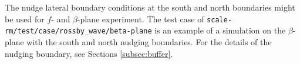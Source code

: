 The nudge lateral boundary conditions at the south and north boundaries might be used for $f$- and $\beta$-plane experiment.
The test case of \verb|scale-rm/test/case/rossby_wave/beta-plane| is an example of a simulation on the $\beta$-plane with the south and north nudging boundaries.
For the details of the nudging boundary, see Sections \ref{subsec:buffer}.

